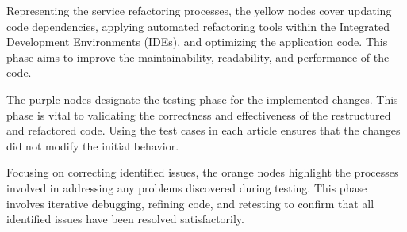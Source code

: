 Representing the service refactoring processes, the yellow nodes cover updating code dependencies, applying automated refactoring tools within the Integrated Development Environments (IDEs), and optimizing the application code. This phase aims to improve the maintainability, readability, and performance of the code. 

The purple nodes designate the testing phase for the implemented changes. This phase is vital to validating the correctness and effectiveness of the restructured and refactored code. Using the test cases in each article ensures that the changes did not modify the initial behavior. 

Focusing on correcting identified issues, the orange nodes highlight the processes involved in addressing any problems discovered during testing. This phase involves iterative debugging, refining code, and retesting to confirm that all identified issues have been resolved satisfactorily.